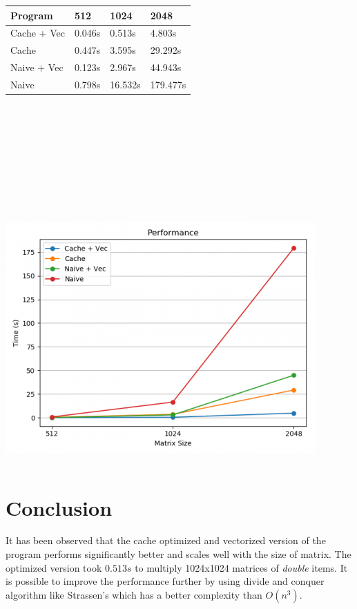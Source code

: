\documentclass[11pt,a4paper,oneside]{article}
\begin{document}
    \begin{center}
    	\begin{tabular}{|l|l|l|l|}
    		\hline
    		Program & 512 & 1024 &  2048\\
    		\hline
    		Cache + Vec & 0.046s & 0.513s & 4.803s \\
    		Cache & 0.447s & 3.595s & 29.292s \\
    		Naive + Vec & 0.123s & 2.967s & 44.943s \\
    		Naive & 0.798s & 16.532s & 179.477s \\				
    		\hline
    	\end{tabular}
    \end{center}

	 \begin{verbatim}









	\end{verbatim}
    
    \begin{center}
	\includegraphics[scale=0.7]{mm_plot.png}
	\end{center}


     \begin{verbatim}
    \end{verbatim}

    \section{Conclusion}
    It has been observed that the cache optimized and vectorized version of the program performs significantly better and scales well with the size of matrix. The optimized version took $0.513s$ to multiply 1024x1024 matrices of \emph{double} items. It is possible to improve the performance further by using divide and conquer algorithm like Strassen's which has a better complexity than $O(n^3)$. 
    
\end{document}
